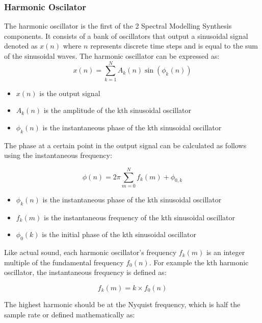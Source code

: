 \subsubsection{Harmonic Oscilator}

The harmonic oscillator is the first of the 2 Spectral Modelling Synthesis components. It consists of a bank of oscillators that output a sinusoidal signal denoted as $x(n)$ where $n$ represents discrete time steps and is equal to the sum of the sinusoidal waves. The harmonic oscillator can be expressed as:
\
\begin{equation}
    x(n) = \sum_{k=1}^{N} A_k(n) \sin(\phi_k(n))
\end{equation}

\begin{itemize}
    \item $x(n)$ is the output signal
    \item $A_k(n)$ is the amplitude of the kth sinusoidal oscillator
    \item $\phi_k(n)$ is the instantaneous phase of the kth sinusoidal oscillator
\end{itemize}

The phase at a certain point in the output signal can be calculated as follows using the instantaneous frequency:

\begin{equation}
    \phi(n) = 2\pi\sum_{m=0}^N f_k(m) + \phi_{0,k}
\end{equation}

\begin{itemize}
    \item $\phi_k(n)$ is the instantaneous phase of the kth sinusoidal oscillator
    \item $f_k(m)$ is the instantaneous frequency of the kth sinusoidal oscillator
    \item $\phi_0(k)$ is the initial phase of the kth sinusoidal oscillator
\end{itemize}

Like actual sound, each harmonic oscillator's frequency $f_k(m)$ is an integer multiple of the fundamental frequency $f_0(n)$. For example the kth harmonic oscillator, the instantaneous frequency is defined as:

\begin{equation}
    f_k(m) = k \times f_0(n)
\end{equation}

The highest harmonic should be at the Nyquist frequency, which is half the sample rate or defined mathematically as:

